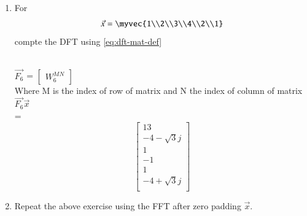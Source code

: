 \documentclass[journal,12pt,twocolumn]{IEEEtran}
\renewcommand\thesection{\arabic{section}}
\begin{document}
\begin{enumerate}[label=\arabic*.,ref=\thesection.\theenumi]
\item For 
    \begin{align}
	    \vec{x} = \myvec{1\\2\\3\\4\\2\\1}
        \label{eq:equation1}
    \end{align}
    compte the DFT  
		using 
	    \eqref{eq:dft-mat-def}
\\
\begin{solution}
	\\$\vec{F_6}$ = $\begin{bmatrix}W_6^{MN}\end{bmatrix}$
	\\Where M is the index of row of matrix and N the index of column of matrix
	\\$\vec{F_6}\vec{x}$
	\\ =
	\begin{equation}
		\begin{bmatrix}
			13 \\
			-4-\sqrt{3}j \\
			1 \\
			-1 \\
			1 \\
			-4 + \sqrt{3}j \\
		\end{bmatrix}
	\end{equation}
\end{solution}
    \item Repeat the above exercise using the FFT
	    after zero padding $\vec{x}$.
\\

\end{enumerate}
\end{document}
